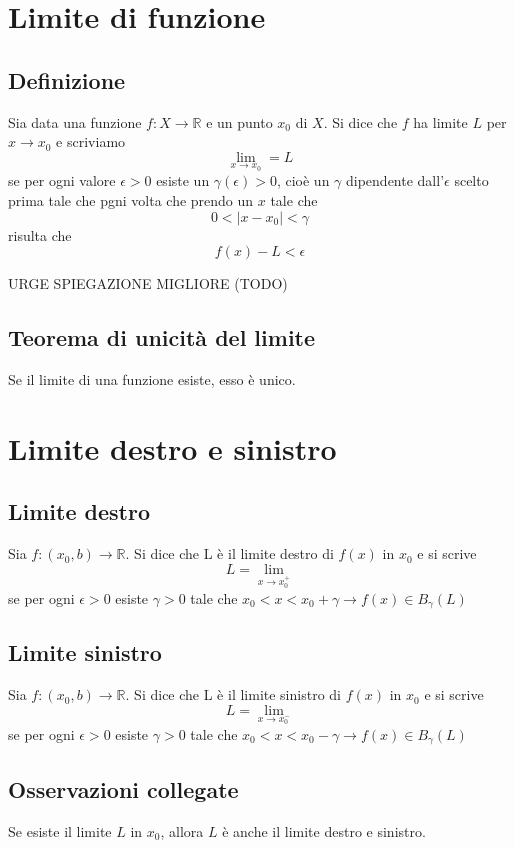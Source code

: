 \section{Limite di funzione}

\subsection{Definizione}
Sia data una funzione $f:X\rightarrow \mathbb{R}$ e un punto $x_0$ di $X$. Si dice che $f$ ha limite $L$ per $x\to x_0$ e scriviamo $$\lim_{x\to x_0}=L$$ se per ogni valore $\epsilon>0$ esiste un $\gamma(\epsilon)>0$, cioè un $\gamma$ dipendente dall'$\epsilon$ scelto prima tale che pgni volta che prendo un $x$ tale che $$0<|x-x_0|<\gamma$$ risulta che $$f(x)-L<\epsilon$$

\begin{tip}
URGE SPIEGAZIONE MIGLIORE (TODO)

\end{tip}

\subsection{Teorema di unicità del limite}
Se il limite di una funzione esiste, esso è unico.

\section{Limite destro e sinistro}

\subsection{Limite destro}
Sia $f:(x_0,b)\rightarrow\mathbb{R}$. Si dice che L è il limite destro di $f(x)$ in $x_0$ e si scrive $$L=\lim_{x\to x^+_0}$$ se per ogni $\epsilon > 0$ esiste $\gamma > 0$ tale che $x_0<x<x_0+\gamma \rightarrow f(x) \in B_{\gamma}(L)$

\subsection{Limite sinistro}
Sia $f:(x_0,b)\rightarrow\mathbb{R}$. Si dice che L è il limite sinistro di $f(x)$ in $x_0$ e si scrive $$L=\lim_{x\to x^-_0}$$ se per ogni $\epsilon > 0$ esiste $\gamma > 0$ tale che $x_0<x<x_0-\gamma \rightarrow f(x) \in B_{\gamma}(L)$

\subsection{Osservazioni collegate}
Se esiste il limite $L$ in $x_0$, allora $L$ è anche il limite destro e sinistro.

